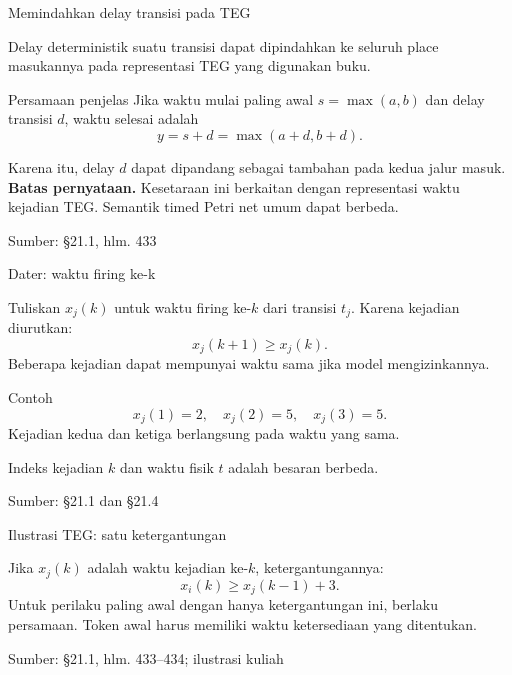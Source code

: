 \documentclass[aspectratio=169,11pt]{beamer}
\newcommand{\source}[1]{%
    \vfill
    \hfill{\tiny\color{gray}Sumber: #1}
}
\begin{document}
\begin{frame}{Memindahkan delay transisi pada TEG}

Delay deterministik suatu transisi dapat dipindahkan ke seluruh
place masukannya pada representasi TEG yang digunakan buku.
\begin{exampleblock}{Persamaan penjelas}
Jika waktu mulai paling awal $s=\max(a,b)$ dan delay transisi $d$,
waktu selesai adalah
\[
y=s+d=\max(a+d,b+d).
\]
\end{exampleblock}
Karena itu, delay $d$ dapat dipandang sebagai tambahan pada kedua jalur masuk.
\medskip\textbf{Batas pernyataan.}
Kesetaraan ini berkaitan dengan representasi waktu kejadian TEG.
Semantik timed Petri net umum dapat berbeda.

\source{\S21.1, hlm. 433}
\end{frame}
\begin{frame}{Dater: waktu firing ke-k}

Tuliskan $x_j(k)$ untuk waktu firing ke-$k$ dari transisi $t_j$.
Karena kejadian diurutkan:
\[
x_j(k+1)\ge x_j(k).
\]
Beberapa kejadian dapat mempunyai waktu sama jika model mengizinkannya.
\begin{exampleblock}{Contoh}
\[
x_j(1)=2,\quad x_j(2)=5,\quad x_j(3)=5.
\]
Kejadian kedua dan ketiga berlangsung pada waktu yang sama.
\end{exampleblock}
Indeks kejadian $k$ dan waktu fisik $t$ adalah besaran berbeda.

\source{\S21.1 dan \S21.4}
\end{frame}
\begin{frame}{Ilustrasi TEG: satu ketergantungan}


\begin{center}\end{center}
Jika $x_j(k)$ adalah waktu kejadian ke-$k$, ketergantungannya:
\[
x_i(k)\ge x_j(k-1)+3.
\]
Untuk perilaku paling awal dengan hanya ketergantungan ini, berlaku persamaan.
Token awal harus memiliki waktu ketersediaan yang ditentukan.

\source{\S21.1, hlm. 433--434; ilustrasi kuliah}

\end{frame}
\end{document}

